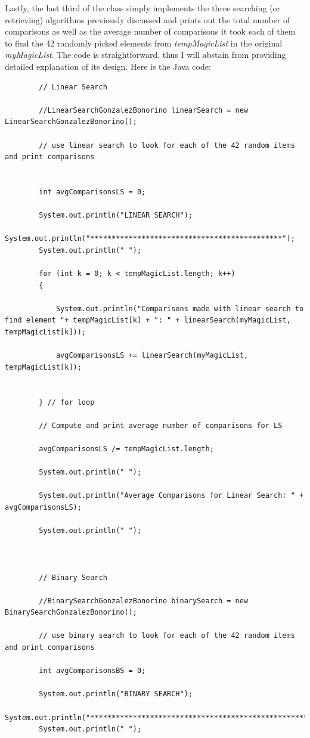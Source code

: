 \documentclass[letterpaper, 10pt]{article}
\begin{document}
Lastly, the last third of the class simply implements the three searching (or retrieving) algorithms previously discussed and prints out the total number of comparisons as well as the average number of comparisons it took each of them to find the 42 randomly picked elements from \textit{tempMagicList} in the original \textit{myMagicList}. The code is straightforward, thus I will abstain from providing detailed explanation of its design. Here is the Java code:
\begin{lstlisting}
        // Linear Search
		
		//LinearSearchGonzalezBonorino linearSearch = new LinearSearchGonzalezBonorino();
		
		// use linear search to look for each of the 42 random items and print comparisons
		

		int avgComparisonsLS = 0;
		
		System.out.println("LINEAR SEARCH");
		System.out.println("*********************************************");
		System.out.println(" ");
		
		for (int k = 0; k < tempMagicList.length; k++)
		{
			
			System.out.println("Comparisons made with linear search to find element "+ tempMagicList[k] + ": " + linearSearch(myMagicList, tempMagicList[k]));
			
			avgComparisonsLS += linearSearch(myMagicList, tempMagicList[k]);
			
			
		} // for loop
		
		// Compute and print average number of comparisons for LS
		
		avgComparisonsLS /= tempMagicList.length;
		
		System.out.println(" ");
		
		System.out.println("Average Comparisons for Linear Search: " + avgComparisonsLS);
		
		System.out.println(" ");
		
		
		
		// Binary Search
		
		//BinarySearchGonzalezBonorino binarySearch = new BinarySearchGonzalezBonorino();
		
		// use binary search to look for each of the 42 random items and print comparisons
		
		int avgComparisonsBS = 0;
		
		System.out.println("BINARY SEARCH");
		System.out.println("****************************************************");
		System.out.println(" ");
		

\end{lstlisting}
\end{document}
